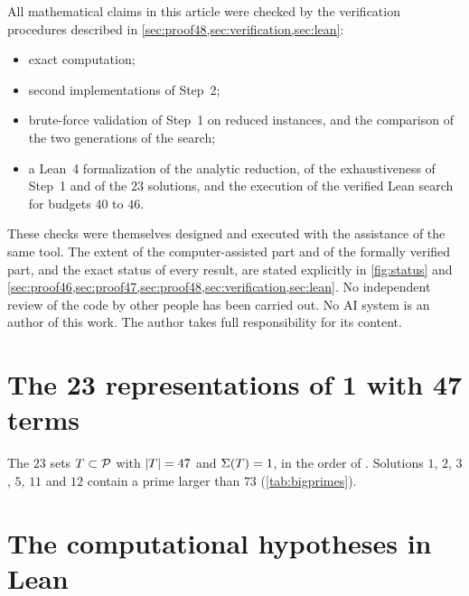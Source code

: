 \documentclass[11pt]{article}
\begin{document}
All mathematical claims in this article were checked by the verification procedures described in \cref{sec:proof48,sec:verification,sec:lean}:
\begin{itemize}
\item exact computation;
\item second implementations of Step~2;
\item brute-force validation of Step~1 on reduced instances, and the comparison of the two generations of the search;
\item a Lean~4 formalization of the analytic reduction, of the exhaustiveness of Step~1 and of the $23$ solutions, and the execution of the verified Lean search for budgets $40$ to $46$.
\end{itemize}
These checks were themselves designed and executed with the assistance of the same tool.
The extent of the computer-assisted part and of the formally verified part, and the exact status of every result, are stated explicitly in \cref{fig:status} and \cref{sec:proof46,sec:proof47,sec:proof48,sec:verification,sec:lean}.
No independent review of the code by other people has been carried out.
No AI system is an author of this work. The author takes full responsibility for its content.




\appendix
\section{The 23 representations of 1 with 47 terms}\label{app:solutions}

The $23$ sets $T\subset\mathcal{P}$ with $\lvert T\rvert=47$ and $\Sigma(T)=1$, in the order of . Solutions $1$, $2$, $3$, $5$, $11$ and $12$ contain a prime larger than $73$ (\cref{tab:bigprimes}).

\medskip


\section{The computational hypotheses in Lean}\label{app:lean}
\end{document}
